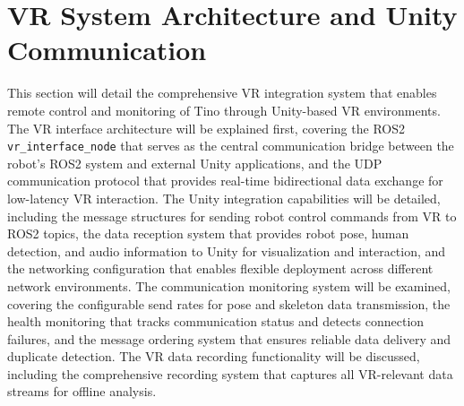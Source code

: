 \section{VR System Architecture and Unity Communication}
This section will detail the comprehensive VR integration system that enables remote control and monitoring of Tino through Unity-based VR environments. The VR interface architecture will be explained first, covering the ROS2 \texttt{vr\_interface\_node} that serves as the central communication bridge between the robot's ROS2 system and external Unity applications, and the UDP communication protocol that provides real-time bidirectional data exchange for low-latency VR interaction. The Unity integration capabilities will be detailed, including the message structures for sending robot control commands from VR to ROS2 topics, the data reception system that provides robot pose, human detection, and audio information to Unity for visualization and interaction, and the networking configuration that enables flexible deployment across different network environments. The communication monitoring system will be examined, covering the configurable send rates for pose and skeleton data transmission, the health monitoring that tracks communication status and detects connection failures, and the message ordering system that ensures reliable data delivery and duplicate detection. The VR data recording functionality will be discussed, including the comprehensive recording system that captures all VR-relevant data streams for offline analysis.

